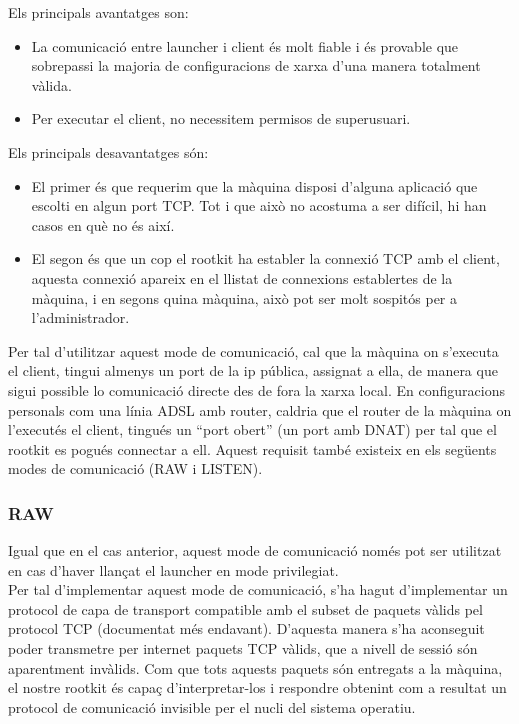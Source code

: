 Els principals avantatges son: \\

\begin{itemize}
    \item La comunicació entre launcher i client és molt fiable i és provable que sobrepassi la majoria de 
        configuracions de xarxa d'una manera totalment vàlida.
    \item Per executar el client, no necessitem permisos de superusuari.
\end{itemize}

Els principals desavantatges són: \\

\begin{itemize}
    \item El primer és que requerim que la màquina disposi d'alguna aplicació que escolti en algun port 
        TCP. Tot i que això no acostuma a ser difícil, hi han casos en què no és així.
    \item El segon és que un cop el rootkit ha establer la connexió TCP amb el client, aquesta connexió
        apareix en el llistat de connexions establertes de la màquina, i en segons quina màquina, això
        pot ser molt sospitós per a l'administrador.
\end{itemize}

Per tal d'utilitzar aquest mode de comunicació, cal que la màquina on s'executa el client, tingui almenys
un port de la ip pública, assignat a ella, de manera que sigui possible lo comunicació directe des de fora
la xarxa local. En configuracions personals com una línia ADSL amb router, caldria que el router de la màquina
on l'executés el client, tingués un ``port obert'' (un port amb DNAT) per tal que el rootkit es pogués 
connectar a ell. Aquest requisit també existeix en els següents modes de comunicació (RAW i LISTEN). \\

\subsubsection{RAW}

Igual que en el cas anterior, aquest mode de comunicació només pot ser utilitzat en cas d'haver llançat el launcher
en mode privilegiat. \\

Per tal d'implementar aquest mode de comunicació, s'ha hagut d'implementar un protocol de capa de transport 
compatible amb el subset de paquets vàlids pel protocol TCP (documentat més endavant). D'aquesta manera s'ha 
aconseguit poder transmetre per internet paquets TCP vàlids, que a nivell de sessió són aparentment invàlids. 
Com que tots aquests paquets són entregats a la màquina, el nostre rootkit és capaç d'interpretar-los i 
respondre obtenint com a resultat un protocol de comunicació invisible per el nucli del sistema operatiu. \\

